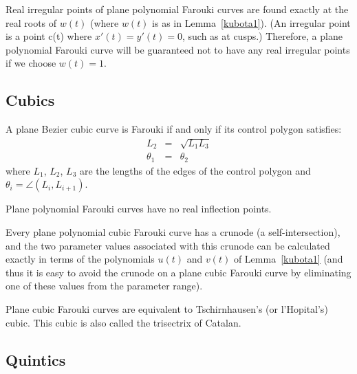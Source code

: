 \begin{prop}
\label{prop:f2}
Real irregular points of plane polynomial Farouki curves 
are found exactly at the real roots of $w(t)$ 
(where $w(t)$ is as in Lemma~\ref{kubota1}).
(An irregular point is a point c(t) where $x'(t) = y'(t) = 0$, such as at cusps.)
Therefore, a plane polynomial Farouki curve will be guaranteed
not to have any real irregular points if we choose $w(t) = 1$.
\end{prop}

\subsection{Cubics}

\begin{prop}
\label{prop:f3}
A plane Bezier cubic curve is Farouki if and only if its
control polygon satisfies:
\begin{eqnarray*}
L_2 & = & \sqrt{L_1 L_3} \\
\theta_1 & = & \theta_2
\end{eqnarray*}
where $L_1$, $L_2$, $L_3$ are the lengths of the edges of the control polygon
and $\theta_i = \angle (L_i,L_{i+1})$.
\end{prop}

\begin{prop}
\label{prop:f4}
Plane polynomial Farouki curves have no real inflection points.
\end{prop}

\begin{prop}
\label{prop:f5}
Every plane polynomial cubic Farouki curve has a crunode (a self-intersection),
and the two parameter values associated with this crunode can be calculated
exactly in terms of the polynomials $u(t)$ and $v(t)$ of Lemma~\ref{kubota1}
(and thus it is easy to avoid the crunode on a plane cubic Farouki curve 
by eliminating one of these values from the parameter range).
\end{prop}

\begin{prop}
\label{prop:f6}
Plane cubic Farouki curves are equivalent to Tschirnhausen's (or l'Hopital's)
cubic.
This cubic is also called the trisectrix of Catalan.
\end{prop}

\clearpage

\subsection{Quintics}

